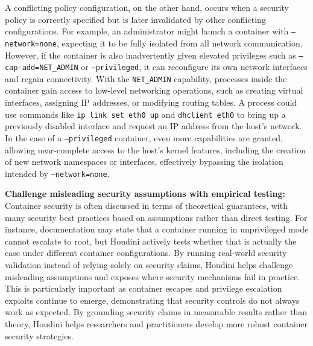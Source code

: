 \documentclass[12pt]{report}
\begin{document}
\begin{doublespace}
A conflicting policy configuration, on the other hand, occurs when a security policy is correctly specified but is later invalidated by other conflicting configurations. For example, an administrator might launch a container with \texttt{--network=none}, expecting it to be fully isolated from all network communication. However, if the container is also inadvertently given elevated privileges such as \texttt{--cap-add=NET\_ADMIN} or \texttt{--privileged}, it can reconfigure its own network interfaces and regain connectivity. With the \texttt{NET\_ADMIN} capability, processes inside the container gain access to low-level networking operations, such as creating virtual interfaces, assigning IP addresses, or modifying routing tables. A process could use commands like \texttt{ip link set eth0 up} and \texttt{dhclient eth0} to bring up a previously disabled interface and request an IP address from the host's network. In the case of a \texttt{--privileged} container, even more capabilities are granted, allowing near-complete access to the host's kernel features, including the creation of new network namespaces or interfaces, effectively bypassing the isolation intended by \texttt{--network=none}.

\noindent\textbf{Challenge misleading security assumptions with empirical testing:}
Container security is often discussed in terms of theoretical guarantees, with many security best practices based on assumptions rather than direct testing. For instance, documentation may state that a container running in unprivileged mode cannot escalate to root, but Houdini actively tests whether that is actually the case under different container configurations. By running real-world security validation instead of relying solely on security claims, Houdini helps challenge misleading assumptions and exposes where security mechanisms fail in practice. This is particularly important as container escapes and privilege escalation exploits continue to emerge, demonstrating that security controls do not always work as expected. By grounding security claims in measurable results rather than theory, Houdini helps researchers and practitioners develop more robust container security strategies.


\end{doublespace}
\end{document}
